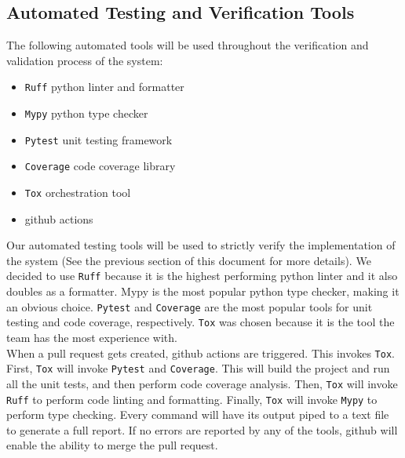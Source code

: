 \documentclass[12pt, titlepage]{article}
\begin{document}

\subsection{Automated Testing and Verification Tools}
The following automated tools will be used throughout the verification and validation
process of the system:
\begin{itemize}
  \item \texttt{Ruff} python linter and formatter
  \item \texttt{Mypy} python type checker
  \item \texttt{Pytest} unit testing framework
  \item \texttt{Coverage} code coverage library
  \item \texttt{Tox} orchestration tool
  \item github actions
\end{itemize}

\noindent
Our automated testing tools will be used to strictly verify the implementation of the system
(See the previous section of this document for more details). We decided to use \texttt{Ruff}
because it is the highest performing python linter and it also doubles as a formatter. Mypy is the most
popular python type checker, making it an obvious choice. \texttt{Pytest} and \texttt{Coverage} are the
most popular tools for unit testing and code coverage, respectively. \texttt{Tox} was chosen because
it is the tool the team has the most experience with.\\

\noindent
When a pull request gets created, github actions are triggered. This invokes \texttt{Tox}. First,
\texttt{Tox} will invoke \texttt{Pytest} and \texttt{Coverage}. This will build the project and run
all the unit tests, and then perform code coverage analysis. Then, \texttt{Tox} will invoke \texttt{Ruff}
to perform code linting and formatting. Finally, \texttt{Tox} will invoke \texttt{Mypy} to perform type
checking. Every command will have its output piped to a text file to generate a full report. If no errors
are reported by any of the tools, github will enable the ability to merge the pull request.\\
\end{document}
